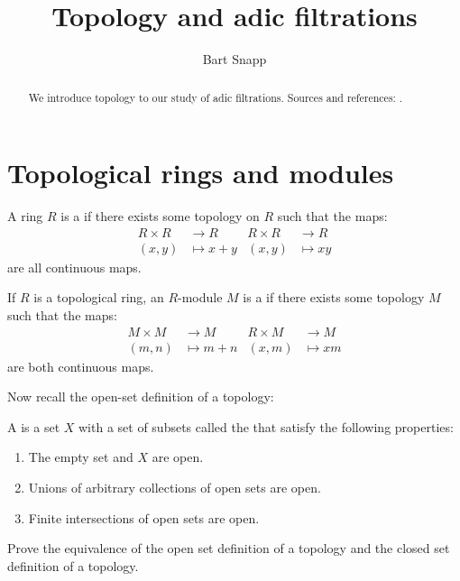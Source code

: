 \documentclass{ximera}
\author{Bart Snapp}
\title{Topology and adic filtrations}
\begin{document}
\begin{abstract}
  We introduce topology to our study of adic filtrations. Sources and
  references: \cite{sD2008,jpS2000}.
\end{abstract}
\maketitle


\section{Topological rings and modules}

\begin{definition}
  A ring $R$ is a  if there exists some topology
  on $R$ such that the maps:
  \begin{align*}
    R\times R &\to R    & R\times R &\to R    \\
    (x,y) &\mapsto x+y  & (x,y) &\mapsto xy   
  \end{align*}
  are all continuous maps.
\end{definition}


\begin{definition}
  If $R$ is a topological ring, an $R$-module $M$ is a
   if there exists some topology $M$ such that
  the maps:
  \begin{align*}
    M\times M &\to M    & R\times M &\to M \\
    (m,n) &\mapsto m+n  & (x,m) &\mapsto xm
  \end{align*}
  are both continuous maps.
\end{definition}


Now recall the open-set definition of a topology:

\begin{definition}
  A  is a set $X$ with a set of subsets called
  the  that satisfy the following properties:
  \begin{enumerate}
  \item The empty set and $X$ are open.
  \item Unions of arbitrary collections of open sets are
    open.
  \item Finite intersections of open sets are open.
  \end{enumerate}
\end{definition}

\begin{exercise}
  Prove the equivalence of the open set definition of a topology and
  the closed set definition of a topology.
\end{exercise}
\end{document}
